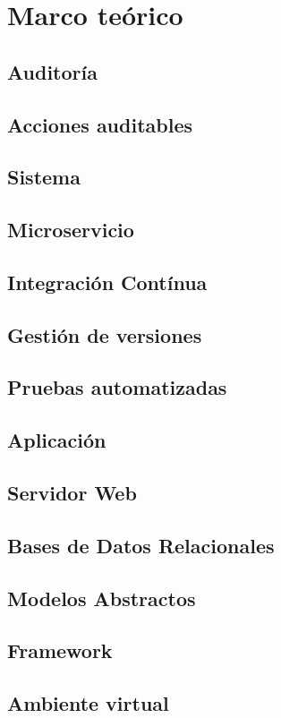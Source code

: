 \chapter{\textbf{Marco teórico}}

\thispagestyle{empty}

\section{Auditoría}
\section{Acciones auditables}
\section{Sistema}
\section{Microservicio}
\section{Integración Contínua}
\section{Gestión de versiones}
\section{Pruebas automatizadas}
\section{Aplicación }
\section{Servidor Web}
\section{Bases de Datos Relacionales}
\section{Modelos Abstractos}
\section{Framework}
\section{Ambiente virtual}
